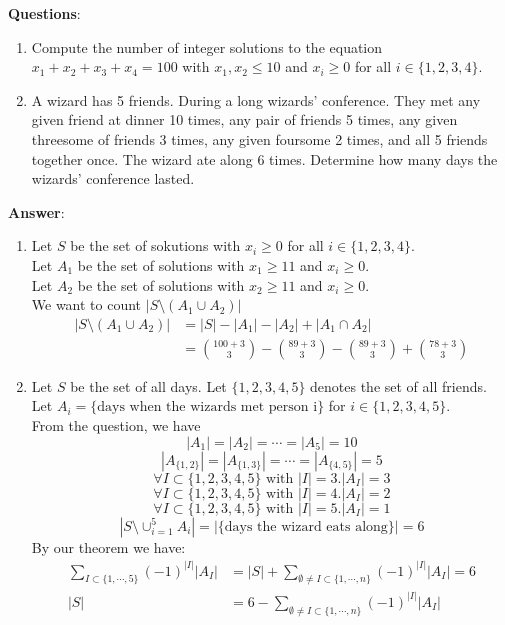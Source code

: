 \noindent \textbf{Questions}:
\begin{enumerate}
    \item Compute the number of integer solutions to the equation $x_1+x_2+x_3+x_4=100$ with $x_1,x_2 \leq 10$ and $x_i \geq 0$ for all $i \in \{1,2,3,4\}$.
    \item A wizard has 5 friends. During a long wizards' conference. They met any given friend at dinner 10 times, any pair of friends 5 times, 
    any given threesome of friends 3 times, any given foursome 2 times, and all 5 friends together once. 
    The wizard ate along 6 times. Determine how many days the wizards' conference lasted.
\end{enumerate}

\noindent \textbf{Answer}:
\begin{enumerate}
    \item Let $S$ be the set of sokutions with $x_i \geq 0$ for all $i \in \{1,2,3,4\}$.\\
    Let $A_1$ be the set of solutions with $x_1 \geq 11$ and $x_i \geq 0$.\\
    Let $A_2$ be the set of solutions with $x_2 \geq 11$ and $x_i \geq 0$.\\
    We want to count $|S \setminus (A_1 \cup A_2)|$
    \begin{equation}
        \begin{split}
            |S \setminus (A_1 \cup A_2)| &= |S| -|A_1| -|A_2| + |A_1 \cap A_2|\\
            &= {100+3 \choose 3} -{89+3 \choose 3}-{89+3 \choose 3}+{78+3 \choose 3}
        \end{split}
    \end{equation}
    \item Let $S$ be the set of all days. Let $\{1,2,3,4,5\}$ denotes the set of all friends.\\
    Let $A_i=\{\text{days when the wizards met person i}\}$ for $i \in \{1,2,3,4,5\}$.\\
    From the question, we have 
    $$|A_1|=|A_2|=\cdots=|A_5|=10$$
    $$|A_{\{1,2\}}|=|A_{\{1,3\}}|=\cdots=|A_{\{4,5\}}|=5$$
    $$\forall I \subset \{1,2,3,4,5\} \text{ with } |I|=3. |A_I|=3$$
    $$\forall I \subset \{1,2,3,4,5\} \text{ with } |I|=4. |A_I|=2$$
    $$\forall I \subset \{1,2,3,4,5\} \text{ with } |I|=5. |A_I|=1$$
    $$|S \setminus \cup_{i=1}^5A_i|= |\{\text{days the wizard eats along}\}|=6$$
    By our theorem we have:
    \begin{equation}
        \begin{split}
            \sum_{I \subset \{1,\cdots,5\}}(-1)^{|I|}|A_I| &= |S| + \sum_{\emptyset \neq I \subset \{1,\cdots,n\}}(-1)^{|I|}|A_I|=6\\
            |S| &= 6 - \sum_{\emptyset \neq I \subset \{1,\cdots,n\}}(-1)^{|I|}|A_I|
        \end{split}
    \end{equation}
\end{enumerate}



